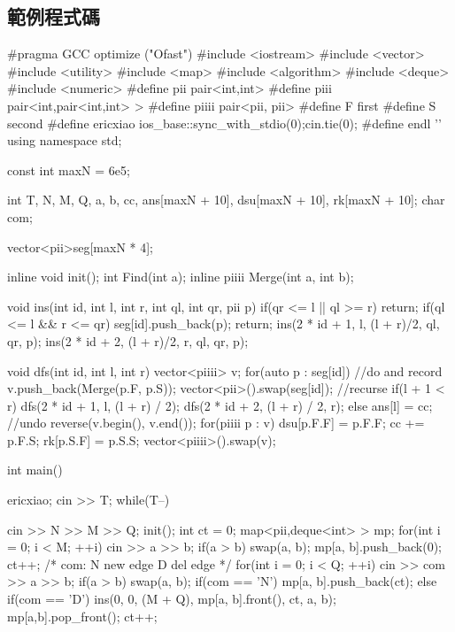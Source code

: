 \subsection{範例程式碼}
\begin{C++}
#pragma GCC optimize ("Ofast")
#include <iostream>
#include <vector>
#include <utility>
#include <map>
#include <algorithm>
#include <deque>
#include <numeric>
#define pii pair<int,int>
#define piii pair<int,pair<int,int> >
#define piiii pair<pii, pii>
#define F first
#define S second
#define ericxiao ios_base::sync_with_stdio(0);cin.tie(0);
#define endl '\n'
using namespace std;

const int maxN = 6e5;

int T, N, M, Q, a, b, cc, ans[maxN + 10], dsu[maxN + 10], rk[maxN + 10];
char com;

vector<pii>seg[maxN * 4];


inline void init();
int  Find(int a);
inline piiii Merge(int a, int b);

void ins(int id, int l, int r, int ql, int qr, pii p){
    if(qr <= l || ql >= r) return;
    if(ql <= l && r <= qr){
        seg[id].push_back(p);
        return;
    }
    ins(2 * id + 1, l, (l + r)/2, ql, qr, p);
    ins(2 * id + 2, (l + r)/2, r, ql, qr, p);
}


void dfs(int id, int l, int r){
    vector<piiii> v;
    for(auto p : seg[id]){
        //do and record
        v.push_back(Merge(p.F, p.S));
    }
    vector<pii>().swap(seg[id]);
    //recurse
    if(l + 1 < r){
        dfs(2 * id + 1, l, (l + r) / 2);
        dfs(2 * id + 2, (l + r) / 2, r);
    } else {
        ans[l] = cc;
    }
    //undo
    reverse(v.begin(), v.end());
    for(piiii p : v){
        dsu[p.F.F] = p.F.F;
        cc += p.F.S;
        rk[p.S.F] = p.S.S;
    }
    vector<piiii>().swap(v);
}

int main(){
    ericxiao;
    cin >> T;
    while(T--){
        cin >> N >> M >> Q;
        init();
        int ct = 0;
        map<pii,deque<int> > mp;
        for(int i = 0; i < M; ++i){
            cin >> a >> b;
            if(a > b) swap(a, b);
            mp[{a, b}].push_back(0);
            ct++;
        }
        /*
        com:
        N new edge
        D del edge
        */
        for(int i = 0; i < Q; ++i){
            cin >> com >> a >> b;
            if(a > b) swap(a, b);
            if(com == 'N'){
                mp[{a, b}].push_back(ct);
            } else if(com == 'D') {
                ins(0, 0, (M + Q), mp[{a, b}].front(), ct, {a, b});
                mp[{a,b}].pop_front();
            }
            ct++;
        }

}}
\end{C++}
